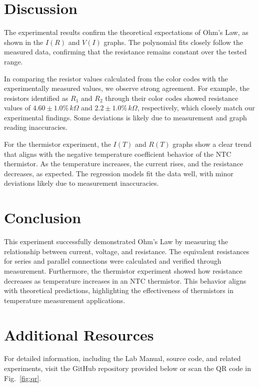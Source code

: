 \documentclass[journal]{IEEEtran}
\begin{document}
\section{Discussion}
The experimental results confirm the theoretical expectations of Ohm's Law, as shown in the $I(R)$ and $V(I)$ graphs. The polynomial fits closely follow the measured data, confirming that the resistance remains constant over the tested range.

In comparing the resistor values calculated from the color codes with the experimentally measured values, we observe strong agreement. For example, the resistors identified as $R_1$ and $R_2$ through their color codes showed resistance values of $4.60 \pm 1.0\% \, k\Omega$ and $2.2 \pm 1.0\% \, k\Omega$, respectively, which closely match our experimental findings. Some deviations is likely due to measurement and graph reading inaccuracies.

For the thermistor experiment, the $I(T)$ and $R(T)$ graphs show a clear trend that aligns with the negative temperature coefficient behavior of the NTC thermistor. As the temperature increases, the current rises, and the resistance decreases, as expected. The regression models fit the data well, with minor deviations likely due to measurement inaccuracies.

\section{Conclusion}
This experiment successfully demonstrated Ohm’s Law by measuring the relationship between current, voltage, and resistance. The equivalent resistances for series and parallel connections were calculated and verified through measurement. Furthermore, the thermistor experiment showed how resistance decreases as temperature increases in an NTC thermistor. This behavior aligns with theoretical predictions, highlighting the effectiveness of thermistors in temperature measurement applications.

\section{Additional Resources}
For detailed information, including the Lab Manual, source code, and related experiments, visit the GitHub repository provided below or scan the QR code in Fig.~\ref{fig:qr}.
\end{document}
